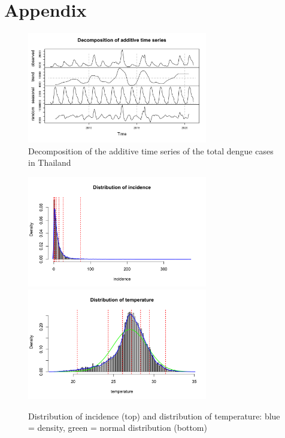 \documentclass[parskip]{scrartcl}
\begin{document}


\newpage
\section{Appendix}

\begin{figure}[htbp] 
	\centering
	\includegraphics[width=0.7\textwidth]{fig/Decomposition_of_add_ts.png}
	\caption{ Decomposition of the additive time series of the total dengue cases in Thailand}
	\label{fig:decomp_ts_dengue}
\end{figure}

\begin{figure}[htbp] 
	\centering
	\includegraphics[width=0.7\textwidth]{fig/dist_incidence.png}
	\includegraphics[width=0.7\textwidth]{fig/dist_temp.png}
	\caption{Distribution of incidence (top)
		and distribution of temperature: blue = density, green = normal distribution (bottom)}
	\label{fig:dist_temp_inc}
\end{figure}
\end{document}
